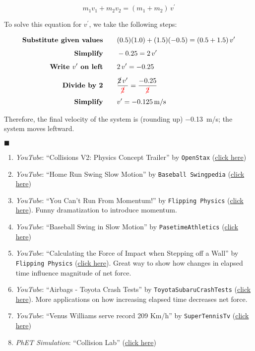 \documentclass[dvipsnames]{article}
\begin{document}
\begin{equation*}
    m_1 v_1 + m_2 v_2 = (m_1 + m_2)\,v^{\prime}
\end{equation*}

To solve this equation for $v^{\prime}$, we take the following steps:
\vspace{-1ex}

\begin{align*}
    \textbf{Substitute given values} \qquad & (0.5)(1.0) + (1.5)(-0.5) = (0.5 + 1.5)\,v^{\prime}\\[1ex]
    \textbf{Simplify} \qquad & -0.25 = 2\,v^{\prime}\\[1ex]
    \textbf{Write $v^{\prime}$ on left} \qquad & 2\,v^{\prime} = -0.25\\[1ex]
    \textbf{Divide by 2} \qquad & \frac{\cancel{2}\,v^{\prime}}{\textcolor{red}{\cancel{2}}} = \frac{-0.25}{\textcolor{red}{\cancel{2}}}\\[1ex]
    \textbf{Simplify} \qquad & v^{\prime} = -\SI{0.125}{m/s}
\end{align*}

Therefore, the final velocity of the system is (rounding up) \SI{-0.13}{m/s}; the system moves leftward.

\hfill $\blacksquare$

\begin{enumerate}
\setlength\itemsep{0.1ex}
    \item \textit{YouTube}: ``Collisions V2: Physics Concept Trailer'' by \texttt{OpenStax} (\href{https://youtu.be/hxMaoFcYSrw}{click here})
    \item \textit{YouTube}: ``Home Run Swing Slow Motion'' by \texttt{Baseball Swingpedia} (\href{https://youtu.be/4cdbV6m_49U}{click here})
    \item \textit{YouTube}: ``You Can't Run From Momentum!'' by \texttt{Flipping Physics} (\href{https://youtu.be/K-lH-DoD6Tk}{click here}). Funny dramatization to introduce momentum. 
    \item \textit{YouTube}: ``Baseball Swing in Slow Motion'' by \texttt{PasetimeAthletics} (\href{https://youtu.be/jvY06zoY0M4}{click here})
    \item \textit{YouTube}: ``Calculating the Force of Impact when Stepping off a Wall'' by \texttt{Flipping Physics} (\href{https://youtu.be/ILIFo2X7EUY}{click here}). Great way to show how changes in elapsed time influence magnitude of net force.
    \item \textit{YouTube}: ``Airbags - Toyota Crash Tests'' by \texttt{ToyotaSubaruCrashTests} (\href{https://youtu.be/Bw0Ps8-KDlQ}{click here}). More applications on how increasing elapsed time decreases net force.
    \item \textit{YouTube}: ``Venus Williams serve record 209 Km/h'' by \texttt{SuperTennisTv} (\href{https://youtu.be/6b1NSgQZvdo}{click here})
    \item \textit{PhET Simulation}: ``Collision Lab'' (\href{https://phet.colorado.edu/en/simulations/collision-lab}{click here})
\end{enumerate}
\end{document}
